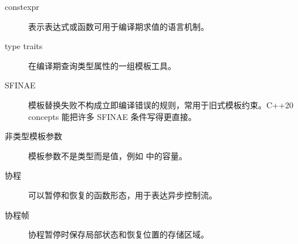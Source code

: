 \begin{description}
  \item[constexpr] 表示表达式或函数可用于编译期求值的语言机制。
  \item[type traits] 在编译期查询类型属性的一组模板工具。
  \item[SFINAE] 模板替换失败不构成立即编译错误的规则，常用于旧式模板约束。C++20 concepts 能把许多 SFINAE 条件写得更直接。
  \item[非类型模板参数] 模板参数不是类型而是值，例如  中的容量。
  \item[协程] 可以暂停和恢复的函数形态，用于表达异步控制流。
  \item[协程帧] 协程暂停时保存局部状态和恢复位置的存储区域。
\end{description}

